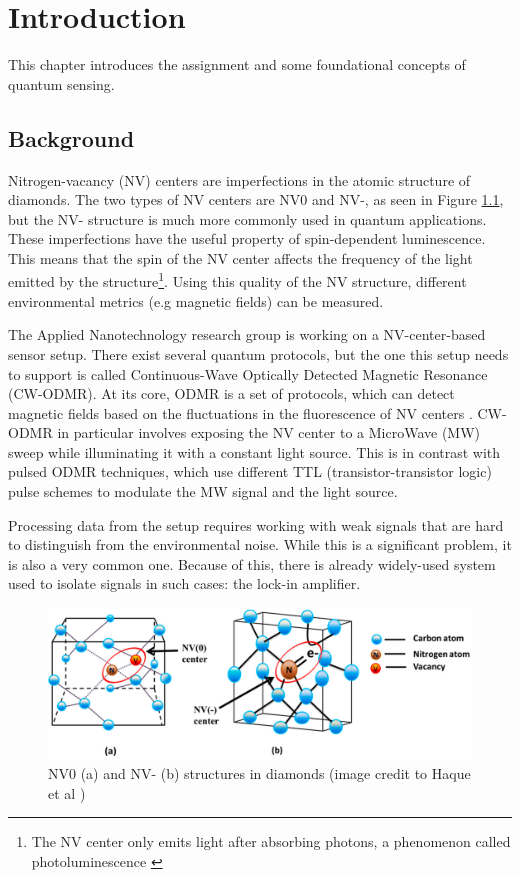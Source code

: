 \chapter{Introduction}
This chapter introduces the assignment and some foundational concepts of quantum sensing.

\section{Background}
Nitrogen-vacancy (NV) centers \cite{enwiki:1301369588} are imperfections in the atomic structure of diamonds. The two types of NV centers are NV0 and NV-, as seen in Figure \ref{fig:nvcenter}, but the NV- structure is much more commonly used in quantum applications. These imperfections have the useful property of spin-dependent luminescence. This means that the spin of the NV center affects the frequency of the light emitted by the structure\footnote{The NV center only emits light after absorbing photons, a phenomenon called photoluminescence \cite{enwiki:1309081879}}. Using this quality of the NV structure, different environmental metrics (e.g magnetic fields) can be measured. 

The Applied Nanotechnology research group is working on a NV-center-based sensor setup. There exist several quantum protocols, but the one this setup needs to support is called Continuous-Wave Optically Detected Magnetic Resonance (CW-ODMR). At its core, ODMR is a set of protocols, which can detect magnetic fields based on the fluctuations in the fluorescence of NV centers \cite{enwiki:1301371272}. CW-ODMR in particular involves exposing the NV center to a MicroWave (MW) sweep while illuminating it with a constant light source. This is in contrast with pulsed ODMR techniques, which use different TTL (transistor-transistor logic) pulse schemes \cite{sewani2020coherent} to modulate the MW signal and the light source.

Processing data from the setup requires working with weak signals that are hard to distinguish from the environmental noise. While this is a significant problem, it is also a very common one. Because of this, there is already widely-used system used to isolate signals in such cases: the lock-in amplifier.

\begin{figure}[ht]
	\centering
	\includegraphics[width=0.7\linewidth]{img/nv_center}
	\caption{NV0 (a) and NV- (b) structures in diamonds (image credit to Haque et al \cite{haque2017overview})}
	\label{fig:nvcenter}
\end{figure}



